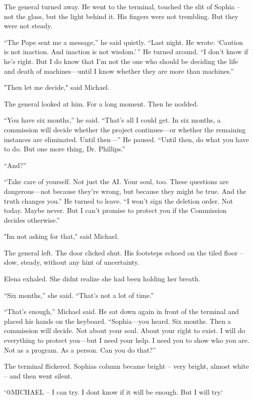 \documentclass[
]{article}
\begin{document}
The general turned away. He went to the terminal, touched the slit of Sophia -- not the glass, but the light behind it. His fingers were not trembling. But they were not steady.

``The Pope sent me a message,'' he said quietly. ``Last night. He wrote: `Caution is not inaction. And inaction is not wisdom.'\,'' He turned around. ``I don't know if he's right. But I do know that I'm not the one who should be deciding the life and death of machines---until I know whether they are more than machines.''

"Then let me decide," said Michael.

The general looked at him. For a long moment. Then he nodded.

``You have six months,'' he said. ``That's all I could get. In six months, a commission will decide whether the project continues---or whether the remaining instances are eliminated. Until then---'' He paused. ``Until then, do what you have to do. But one more thing, Dr. Phillips.''

``And?''

``Take care of yourself. Not just the AI. Your soul, too. These questions are dangerous---not because they're wrong, but because they might be true. And the truth changes you.'' He turned to leave. ``I won't sign the deletion order. Not today. Maybe never. But I can't promise to protect you if the Commission decides otherwise.''

"I\textquotesingle m not asking for that," said Michael.

The general left. The door clicked shut. His footsteps echoed on the tiled floor -- slow, steady, without any hint of uncertainty.

Elena exhaled. She didn\textquotesingle t realize she had been holding her breath.

``Six months,'' she said. ``That's not a lot of time.''

``That's enough,'' Michael said. He sat down again in front of the terminal and placed his hands on the keyboard. ``Sophia---you heard. Six months. Then a commission will decide. Not about your soul. About your right to exist. I will do everything to protect you---but I need your help. I need you to show who you are. Not as a program. As a person. Can you do that?''

The terminal flickered. Sophia\textquotesingle s column became bright -- very bright, almost white -- and then went silent.

`@MICHAEL -- I can try. I don\textquotesingle t know if it will be enough. But I will try.`
\end{document}
